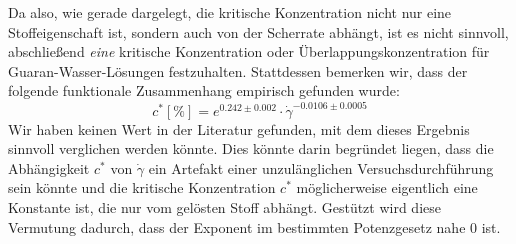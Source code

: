 \documentclass[11pt,a4paper,oneside]{scrartcl}
\begin{document}
Da also, wie gerade dargelegt, die kritische Konzentration nicht nur eine Stoffeigenschaft ist, sondern auch von der Scherrate abhängt, ist es nicht sinnvoll, abschließend \emph{eine} kritische Konzentration oder Überlappungskonzentration für Guaran-Wasser-Lösungen festzuhalten. Stattdessen bemerken wir, dass der folgende funktionale Zusammenhang empirisch gefunden wurde:
\begin{equation}
c^*[\%]=e^{0.242\pm0.002}\cdot\dot\gamma^{-0.0106\pm0.0005}
\end{equation}
Wir haben keinen Wert in der Literatur gefunden, mit dem dieses Ergebnis sinnvoll verglichen werden könnte. Dies könnte darin begründet liegen, dass 
die Abhängigkeit $c^*$ von $\dot\gamma$ ein Artefakt einer unzulänglichen Versuchsdurchführung sein könnte und die kritische Konzentration $c^*$ möglicherweise eigentlich eine Konstante ist, die nur vom gelösten Stoff abhängt. Gestützt wird diese Vermutung dadurch, dass der Exponent im bestimmten Potenzgesetz nahe 0 ist. 



\end{document}
